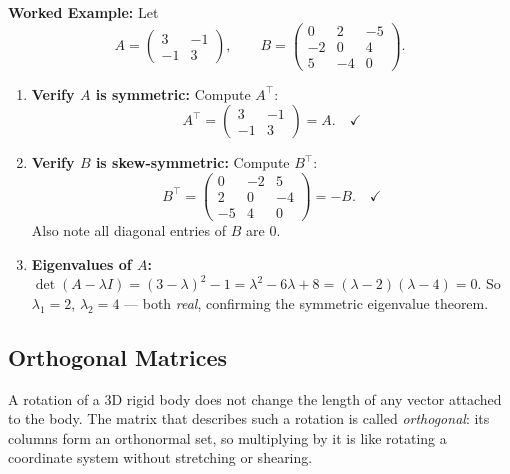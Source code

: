\documentclass[12pt,a4paper]{article}
\begin{document}
\textbf{Worked Example:} Let
\[
  A = \begin{pmatrix} 3 & -1 \\ -1 & 3 \end{pmatrix}, \qquad
  B = \begin{pmatrix} 0 & 2 & -5 \\ -2 & 0 & 4 \\ 5 & -4 & 0 \end{pmatrix}.
\]
\begin{enumerate}
  \item \textbf{Verify $A$ is symmetric:} Compute $A^\top$:
    \[
      A^\top = \begin{pmatrix} 3 & -1 \\ -1 & 3 \end{pmatrix} = A. \quad \checkmark
    \]
  \item \textbf{Verify $B$ is skew-symmetric:} Compute $B^\top$:
    \[
      B^\top = \begin{pmatrix} 0 & -2 & 5 \\ 2 & 0 & -4 \\ -5 & 4 & 0 \end{pmatrix} = -B. \quad \checkmark
    \]
    Also note all diagonal entries of $B$ are $0$.
  \item \textbf{Eigenvalues of $A$:} $\det(A - \lambda I) = (3-\lambda)^2 - 1 = \lambda^2 - 6\lambda + 8 = (\lambda-2)(\lambda-4) = 0$.
    So $\lambda_1 = 2$, $\lambda_2 = 4$ --- both \emph{real}, confirming the symmetric eigenvalue theorem.
\end{enumerate}

\subsection{Orthogonal Matrices}

A rotation of a 3D rigid body does not change the length of any vector attached to the body.
The matrix that describes such a rotation is called \emph{orthogonal}: its columns form an orthonormal set,
so multiplying by it is like rotating a coordinate system without stretching or shearing.
\end{document}
